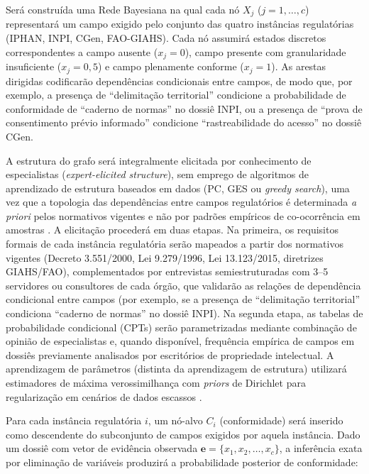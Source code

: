 \documentclass[preprint,12pt,authoryear]{elsarticle}
\begin{document}
Será construída uma Rede Bayesiana na qual cada nó $X_j$ ($j = 1, \ldots, c$) representará um campo exigido pelo conjunto das quatro instâncias regulatórias (IPHAN, INPI, CGen, FAO-GIAHS). Cada nó assumirá estados discretos correspondentes a campo ausente ($x_j = 0$), campo presente com granularidade insuficiente ($x_j = 0{,}5$) e campo plenamente conforme ($x_j = 1$). As arestas dirigidas codificarão dependências condicionais entre campos, de modo que, por exemplo, a presença de ``delimitação territorial'' condicione a probabilidade de conformidade de ``caderno de normas'' no dossiê INPI, ou a presença de ``prova de consentimento prévio informado'' condicione ``rastreabilidade do acesso'' no dossiê CGen.

A estrutura do grafo será integralmente elicitada por conhecimento de especialistas (\textit{expert-elicited structure}), sem emprego de algoritmos de aprendizado de estrutura baseados em dados (PC, GES ou \textit{greedy search}), uma vez que a topologia das dependências entre campos regulatórios é determinada \textit{a priori} pelos normativos vigentes e não por padrões empíricos de co-ocorrência em amostras \citep{Pearl2009}. A elicitação procederá em duas etapas. Na primeira, os requisitos formais de cada instância regulatória serão mapeados a partir dos normativos vigentes (Decreto 3.551/2000, Lei 9.279/1996, Lei 13.123/2015, diretrizes GIAHS/FAO), complementados por entrevistas semiestruturadas com 3--5 servidores ou consultores de cada órgão, que validarão as relações de dependência condicional entre campos (por exemplo, se a presença de ``delimitação territorial'' condiciona ``caderno de normas'' no dossiê INPI). Na segunda etapa, as tabelas de probabilidade condicional (CPTs) serão parametrizadas mediante combinação de opinião de especialistas e, quando disponível, frequência empírica de campos em dossiês previamente analisados por escritórios de propriedade intelectual. A aprendizagem de parâmetros (distinta da aprendizagem de estrutura) utilizará estimadores de máxima verossimilhança com \textit{priors} de Dirichlet para regularização em cenários de dados escassos \citep{Koller2009}.

Para cada instância regulatória $i$, um nó-alvo $C_i$ (conformidade) será inserido como descendente do subconjunto de campos exigidos por aquela instância. Dado um dossiê com vetor de evidência observada $\mathbf{e} = \{x_1, x_2, \ldots, x_c\}$, a inferência exata por eliminação de variáveis produzirá a probabilidade posterior de conformidade:
\end{document}
